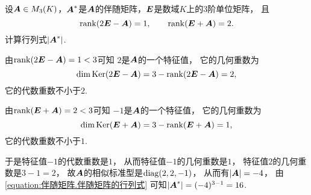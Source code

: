 \begin{example}
设\(\boldsymbol{A} \in M_3(K)\)，\(\boldsymbol{A}^*\)是\(\boldsymbol{A}\)的伴随矩阵，\(\boldsymbol{E}\)是数域\(K\)上的3阶单位矩阵，
且\begin{equation*}
	\rank(2\boldsymbol{E}-\boldsymbol{A}) = 1,
	\qquad
	\rank(\boldsymbol{E}+\boldsymbol{A}) = 2.
\end{equation*}
计算行列式\(\abs{\boldsymbol{A}^*}\).
\begin{solution}
由\(\rank(2\boldsymbol{E}-\boldsymbol{A}) = 1 < 3\)可知
\(2\)是\(\boldsymbol{A}\)的一个特征值，
它的几何重数为\begin{equation*}
	\dim\operatorname{Ker}(2\boldsymbol{E}-\boldsymbol{A})
	= 3 - \rank(2\boldsymbol{E}-\boldsymbol{A})
	= 2,
\end{equation*}
它的代数重数不小于\(2\).

由\(\rank(\boldsymbol{E}+\boldsymbol{A}) = 2 < 3\)可知
\(-1\)是\(\boldsymbol{A}\)的一个特征值，
它的几何重数为\begin{equation*}
	\dim\operatorname{Ker}(\boldsymbol{E}+\boldsymbol{A})
	= 3 - \rank(\boldsymbol{E}+\boldsymbol{A})
	= 1,
\end{equation*}
它的代数重数不小于\(1\).

于是特征值\(-1\)的代数重数是\(1\)，
从而特征值\(-1\)的几何重数是\(1\)，
特征值\(2\)的几何重数是\(3-1=2\)，
故\(\boldsymbol{A}\)的相似标准型是\(\operatorname{diag}(2,2,-1)\)，
从而有\(\abs{\boldsymbol{A}} = -4\)，
由\cref{equation:伴随矩阵.伴随矩阵的行列式}
可知\(\abs{\boldsymbol{A}^*} = (-4)^{3-1} = 16\).
\end{solution}
\end{example}
